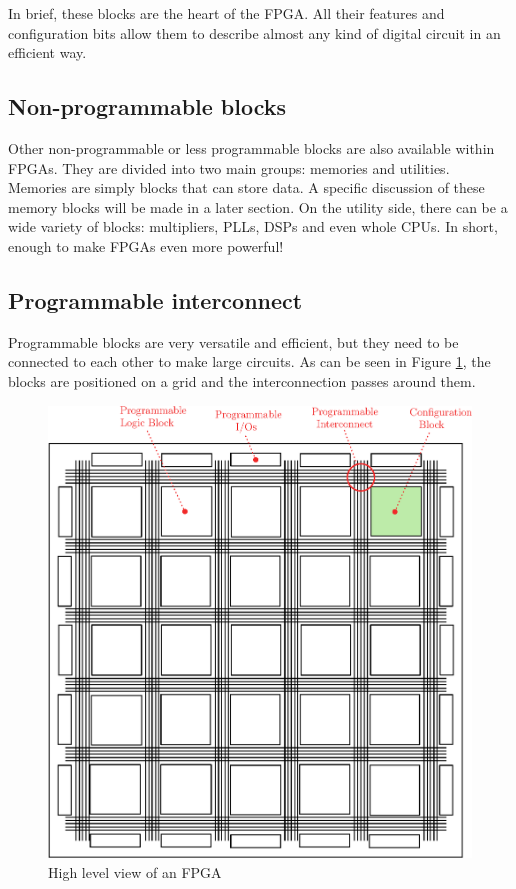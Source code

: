In brief, these blocks are the heart of the FPGA. All their features and configuration bits allow 
them to describe almost any kind of digital circuit in an efficient way.

\subsection{Non-programmable blocks}

Other non-programmable or less programmable blocks are also available within FPGAs. They are divided 
into two main groups: memories and utilities. Memories are simply blocks that can store data. A 
specific discussion of these memory blocks will be made in a later section. On the utility side, 
there can be a wide variety of blocks: multipliers, PLLs, DSPs and even whole CPUs. In short, 
enough to make FPGAs even more powerful!

\subsection{Programmable interconnect}

Programmable blocks are very versatile and efficient, but they need to be connected to each other to 
make large circuits. As can be seen in Figure \ref{fig:fpga/fpga_interconnect}, the blocks are 
positioned on a grid and the interconnection passes around them. 

\begin{figure}[H]
    \centering
    \includegraphics[scale=0.6]{Chapter1-Hardware/res/fpga_interconnect}
    \caption{High level view of an FPGA}
    \label{fig:fpga/fpga_interconnect}
\end{figure}

